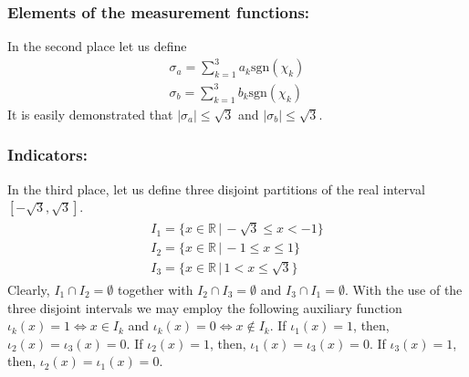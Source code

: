 \documentclass{appolb}
\newcommand{\sgn}{\text{sgn}}
\begin{document}
\subsubsection{Elements of the measurement functions:}
In the second place let us define
\begin{eqnarray}\label{14}
\sigma_{a}=\sum_{k=1}^3 a_k \sgn(\chi_k)\nonumber \\
\sigma_{b}=\sum_{k=1}^3 b_k \sgn(\chi_k)
\end{eqnarray}
It is easily demonstrated that $|\sigma_{a}|\leq \sqrt{3}$ and $|\sigma_{b}|\leq \sqrt{3}$.
\subsubsection{Indicators:} 
In the third place, let us define three disjoint partitions of the real interval $[-\sqrt{3},\sqrt{3}]$.
\begin{eqnarray}\label{15}
\begin{array}{ll}
I_1=\{x \in \mathbb{R} \,|\, -\sqrt{3}\leq x < -1\}\\
I_2=\{x \in \mathbb{R} \,|\, -1\leq x \leq 1\}\\
I_3=\{x \in \mathbb{R} \,|\, 1 < x \leq \sqrt{3} \}
\end{array}
\end{eqnarray}
Clearly, $I_1 \cap I_2 =\emptyset$ together with $I_2 \cap I_3 =\emptyset$  and $I_3 \cap I_1 =\emptyset$. With the use of the three disjoint intervals we may employ the following auxiliary function $\iota_k(x)=1 \Leftrightarrow x \in I_k$ and $\iota_k(x)=0 \Leftrightarrow x \notin I_k$. If $\iota_1(x)=1$, then, $\iota_2(x)=\iota_3(x)=0$. If $\iota_2(x)=1$, then, $\iota_1(x)=\iota_3(x)=0$. If $\iota_3(x)=1$, then, $\iota_2(x)=\iota_1(x)=0$.
\end{document}
